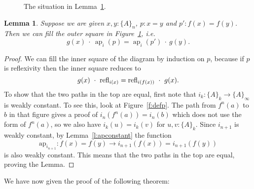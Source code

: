 \documentclass[square]{sigplanconf}
\DeclareMathOperator{\myap}{ap}
\newcommand{\refl}{\textnormal{refl}}
\newcommand{\ap}[2]{\ensuremath{\myap_{#1}(#2)}}
\newtheorem{lemma}[theorem]{Lemma}
\theoremstyle{definition}
\theoremstyle{remark}
\begin{document}
\begin{figure}\begin{center}
\caption{The situation in Lemma~\ref{l:cohplemma}.}
\label{f:cohplemma}
\end{center}\end{figure}

\begin{lemma}\label{l:cohplemma}
  Suppose we are given $x,y : \{A\}_n$, $p:x=y$ and $p' : f(x) = f(y)$. Then we can fill the outer
  square in Figure~\ref{f:cohplemma}, i.e.
    $$g(x)\ \cdot\ \ap ip = \ap i{p'}\ \cdot\ g(y).$$
\end{lemma}
\begin{proof}
We can fill the inner square of the diagram by induction on $p$, because if $p$ is reflexivity then
the inner square reduces to
  $$g(x)\ \cdot\ \refl_{i(x)}=\refl_{i(f(x))}\ \cdot\ g(x).$$ To show that the two paths in the top
are equal, first note that $i_{k} : \{A\}_{k} \to \{A\}_\infty$ is weakly constant. To see this,
look at Figure~\ref{f:defp}. The path from $f^n(a)$ to $b$ in that figure gives a proof of
$i_n(f^n(a))=i_n(b)$ which does not use the form of $f^n(a)$, so we also have $i_k(u)=i_k(v)$ for
$u,v :\{A\}_k$. Since $i_{n+1}$ is weakly constant, by Lemma~\ref{l:apconstant} the
function $$\text{ap}_{i_{n+1}} : f(x)=f(y)\to i_{n+1}(f(x))=i_{n+1}(f(y))$$ is also weakly
constant. This means that the two paths in the top are equal, proving the Lemma.
\end{proof}
We have now given the proof of the following theorem:
\end{document}
